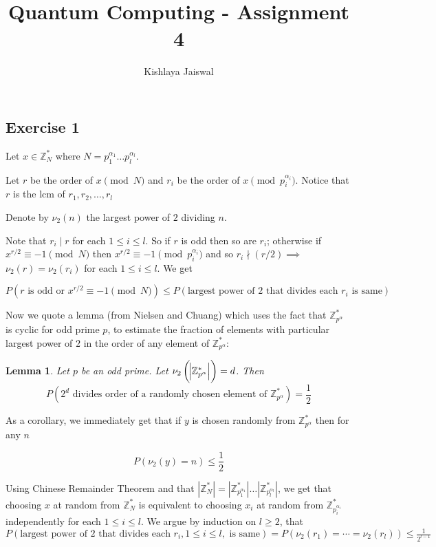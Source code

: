 \documentclass{article}
\title{Quantum Computing - Assignment 4}
\author{Kishlaya Jaiswal}
\newtheorem*{lemma}{Lemma}
\begin{document}
\maketitle

\subsection*{Exercise 1}

Let $x \in \mathbb{Z}_N^*$ where $N = p_1^{\alpha_1} \ldots p_l^{\alpha_l}$.

Let $r$ be the order of $x \pmod{N}$ and $r_i$ be the order of $x \pmod{p_i^{\alpha_i}}$. Notice that $r$ is the lcm of $r_1, r_2, \ldots, r_l$

Denote by $\nu_2(n)$ the largest power of $2$ dividing $n$.

Note that $r_i \mid r$ for each $1 \leq i \leq l$. So if $r$ is odd then so are $r_i$; otherwise if $x^{r/2} \equiv -1 \pmod{N}$ then $x^{r/2} \equiv -1 \pmod{p_i^{\alpha_i}}$ and so $r_i \nmid (r/2) \implies$ $\nu_2(r) = \nu_2(r_i)$ for each $1 \leq i \leq l$. We get

$$P(r \text{ is odd or } x^{r/2} \equiv -1 \pmod{N}) \leq P(\text{largest power of 2 that divides each } r_i \text{ is same})$$

Now we quote a lemma (from Nielsen and Chuang) which uses the fact that $\mathbb{Z}_{p^{\alpha}}^*$ is cyclic for odd prime $p$, to estimate the fraction of elements with particular largest power of $2$ in the order of any element of $\mathbb{Z}_{p^{\alpha}}^*$:
\begin{lemma}
Let $p$ be an odd prime. Let $\nu_2\left(\abs{\mathbb{Z}_{p^{\alpha}}^*}\right) = d$. Then
$$P(2^d \text{ divides order of a randomly chosen element of } \mathbb{Z}_{p^{\alpha}}^*) = \frac12$$ 
\end{lemma}

As a corollary, we immediately get that if $y$ is chosen randomly from $\mathbb{Z}_{p^{\alpha}}^*$ then for any $n$

$$P(\nu_2(y) = n) \leq \frac12$$

Using Chinese Remainder Theorem and that $|\mathbb{Z}_N^*| = |\mathbb{Z}_{p_1^{\alpha_1}}^*| \ldots |\mathbb{Z}_{p_l^{\alpha_l}}^*|$, we get that choosing $x$ at random from $\mathbb{Z}_N^*$ is equivalent to choosing $x_i$ at random from $\mathbb{Z}_{p_i^{\alpha_i}}^*$ independently for each $1 \leq i \leq l$. We argue by induction on $l \geq 2$, that $P(\text{largest power of 2 that divides each } r_i, 1 \leq i \leq l, \text{ is same}) = P(\nu_2(r_1) = \cdots = \nu_2(r_l)) \leq \frac{1}{2^{l-1}}$
\end{document}
